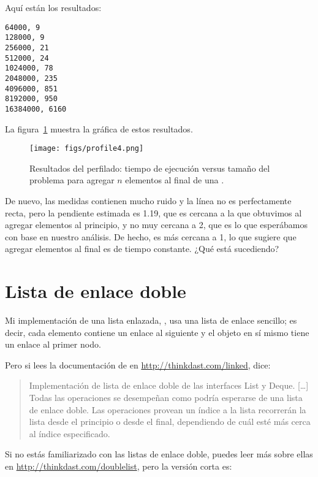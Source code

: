 \documentclass[12pt]{book}
\theoremstyle{exercise}
\begin{document}
Aquí están los resultados:

\begin{verbatim}
64000, 9
128000, 9
256000, 21
512000, 24
1024000, 78
2048000, 235
4096000, 851
8192000, 950
16384000, 6160
\end{verbatim}

La figura~\ref{fig-profile4}
muestra la gráfica de estos resultados.

\begin{figure}
\centering
\texttt{[image: figs/profile4.png]}
\caption{Resultados del perfilado: tiempo de ejecución versus tamaño del problema
para agregar $n$ elementos al final de una .}
\label{fig-profile4}
\end{figure}


De nuevo, las medidas contienen mucho ruido y la línea no es perfectamente
recta, pero la pendiente estimada es 1.19, que es cercana a la que obtuvimos
al agregar elementos al principio, y no muy cercana a 2, que es lo que
esperábamos con base en nuestro análisis. De hecho, es más cercana a
1, lo que sugiere que agregar elementos al final es de tiempo constante.
¿Qué está sucediendo?


\section{Lista de enlace doble}
\label{doubly-linked-list}

Mi implementación de una lista enlazada, , usa una
lista de enlace sencillo; es decir, cada elemento contiene un enlace al siguiente
y el objeto  en sí mismo tiene un enlace al primer nodo.


Pero si lees la documentación de  en
\url{http://thinkdast.com/linked},
dice:

\begin{quote}
Implementación de lista de enlace doble de las interfaces
List y Deque. [\ldots] Todas las operaciones se desempeñan
como podría esperarse de una lista de enlace doble. Las operaciones
provean un índice a la lista recorrerán la lista desde el principio o desde
el final, dependiendo de cuál esté más cerca al índice especificado.
\end{quote}

Si no estás familiarizado con las listas de enlace doble, puedes leer
más sobre ellas en \url{http://thinkdast.com/doublelist}, pero la
versión corta es:
\end{document}
